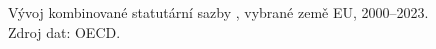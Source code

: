 \def\strStavKorporatniDanVyvojTitle{Vývoj kombinované sazby \acs{DPPO}}%
\def\strStavKorporatniDanVyvojYlabel{sazba [\si{\percent}]}%
\providecommand\NudgeStavKorporatniDanVyvojCz{0pt}%
\providecommand\NudgeStavKorporatniDanVyvojAt{0pt}%
\providecommand\NudgeStavKorporatniDanVyvojDe{0pt}%
\providecommand\NudgeStavKorporatniDanVyvojDk{0pt}%
\providecommand\NudgeStavKorporatniDanVyvojPl{0pt}%
\providecommand\NudgeStavKorporatniDanVyvojSk{0pt}%
\def\strStavKorporatniDanVyvojCaption{Vývoj kombinované statutární sazby \aclgen{DPPO}, vybrané země \acs{EU}, 2000--2023. Zdroj dat: \acs{OECD}.~\cite{oecd_cts_cit}}%
%
\begin{figure}[htbp]
  \centering
  \resizebox{\linewidth}{!}{}
  \caption{\strStavKorporatniDanVyvojCaption}
  \label{fig:stav_korporatni_dan_vyvoj}
\end{figure}
